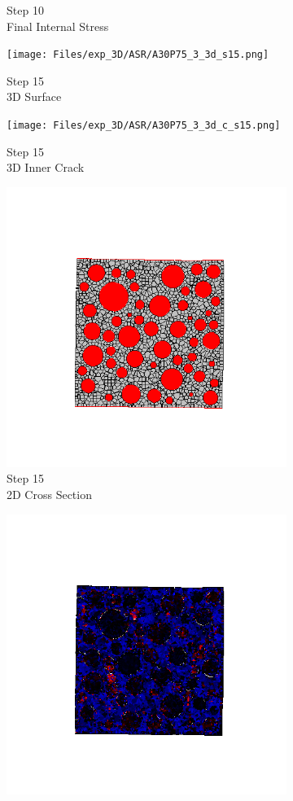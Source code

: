 \begin{figure}[ht!]
\begin{subfigure}{.25\textwidth}
      \caption{Step 10\\Final Internal Stress}
    \end{subfigure}
    \begin{subfigure}{.25\textwidth}
      \centering
      \texttt{[image: Files/exp\_3D/ASR/A30P75\_3\_3d\_s15.png]}
      \caption{Step 15\\3D Surface}
    \end{subfigure}%
    \begin{subfigure}{.25\textwidth}
      \centering
      \texttt{[image: Files/exp\_3D/ASR/A30P75\_3\_3d\_c\_s15.png]}
      \caption{Step 15\\3D Inner Crack}
    \end{subfigure}%
    \begin{subfigure}{.25\textwidth}
      \centering
      \includegraphics[width=.8\linewidth]{Files/exp_3D/ASR/A30P75_3_c15.png}
      \caption{Step 15\\2D Cross Section}
    \end{subfigure}%
    \begin{subfigure}{.25\textwidth}
      \centering
      \includegraphics[width=.8\linewidth]{Files/exp_3D/ASR/A30P75_3_s15.png}

\end{subfigure}
\end{figure}
